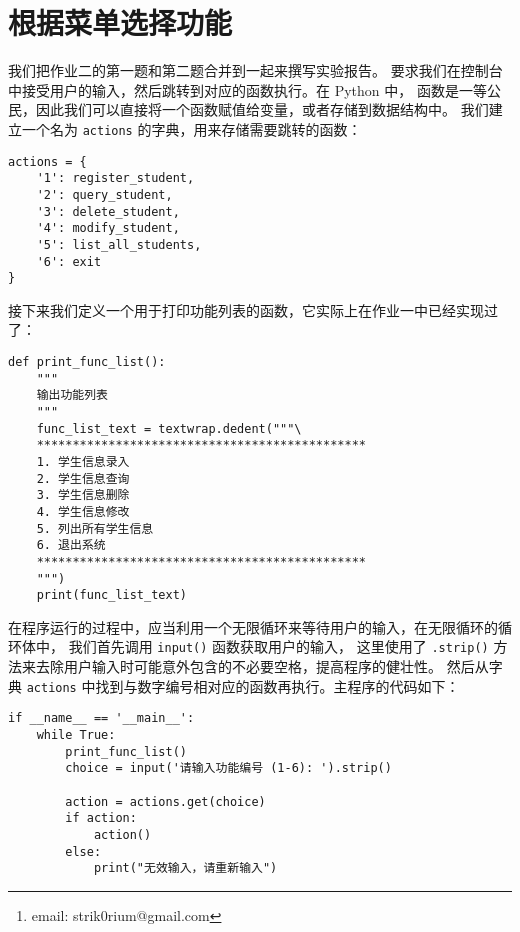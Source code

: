 \documentclass[openany, 10pt]{ctexart}
\title{\thetitle}
\author{Strik0r
\thanks{email: strik0rium@gmail.com}}
\begin{document}


\newpage
{\small \setlength{\parskip}{0em} \tableofcontents}

\section{根据菜单选择功能}

我们把作业二的第一题和第二题合并到一起来撰写实验报告。
要求我们在控制台中接受用户的输入，然后跳转到对应的函数执行。在 Python 中，
函数是一等公民，因此我们可以直接将一个函数赋值给变量，或者存储到数据结构中。
我们建立一个名为 \lstinline|actions| 的字典，用来存储需要跳转的函数：
\begin{lstlisting}
actions = {
    '1': register_student,
    '2': query_student,
    '3': delete_student,
    '4': modify_student,
    '5': list_all_students,
    '6': exit
}
\end{lstlisting}

接下来我们定义一个用于打印功能列表的函数，它实际上在作业一中已经实现过了：
\begin{lstlisting}
def print_func_list():
    """
    输出功能列表
    """
    func_list_text = textwrap.dedent("""\
    **********************************************
    1. 学生信息录入
    2. 学生信息查询
    3. 学生信息删除
    4. 学生信息修改
    5. 列出所有学生信息
    6. 退出系统
    **********************************************
    """)
    print(func_list_text)
\end{lstlisting}

在程序运行的过程中，应当利用一个无限循环来等待用户的输入，在无限循环的循环体中，
我们首先调用 \lstinline|input()| 函数获取用户的输入，
这里使用了 \lstinline|.strip()| 方法来去除用户输入时可能意外包含的不必要空格，提高程序的健壮性。
然后从字典 \lstinline|actions| 中找到与数字编号相对应的函数再执行。主程序的代码如下：
\begin{lstlisting}
if __name__ == '__main__':
    while True:
        print_func_list()
        choice = input('请输入功能编号 (1-6): ').strip()

        action = actions.get(choice)
        if action:
            action()
        else:
            print("无效输入，请重新输入")
\end{lstlisting}
\end{document}
